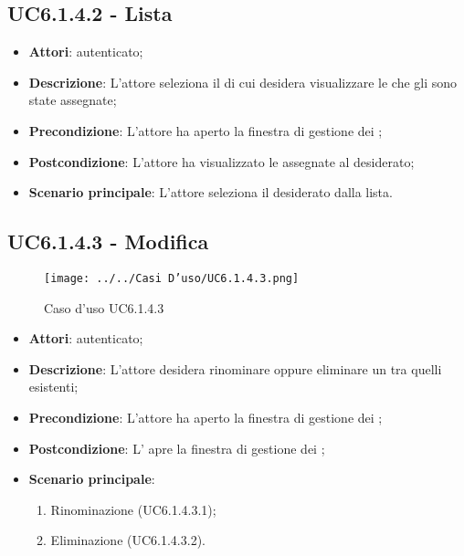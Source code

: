 \subsection{UC6.1.4.2 - Lista }
\label{ssec:UC6.1.4.2}
\begin{itemize}
\item \textbf{Attori}:  autenticato;
\item \textbf{Descrizione}: L'attore seleziona il  di cui desidera visualizzare le  che gli sono state assegnate;
\item \textbf{Precondizione}: L'attore ha aperto la finestra di gestione dei ;
\item \textbf{Postcondizione}: L'attore ha visualizzato le  assegnate al  desiderato;
\item \textbf{Scenario principale}: L'attore seleziona il  desiderato dalla lista.
\end{itemize}
\newpage
\subsection{UC6.1.4.3 - Modifica }
\label{ssec:UC6.1.4.3}
\begin{figure}[h!]
\centering
\texttt{[image: ../../Casi D'uso/UC6.1.4.3.png]}
\caption{Caso d'uso UC6.1.4.3}
 \end{figure}
\begin{itemize}
\item \textbf{Attori}:  autenticato;
\item \textbf{Descrizione}: L'attore desidera rinominare oppure eliminare un  tra quelli esistenti;
\item \textbf{Precondizione}: L'attore ha aperto la finestra di gestione dei ;
\item \textbf{Postcondizione}: L' apre la finestra di gestione dei ;
\item \textbf{Scenario principale}: \begin{enumerate}\item Rinominazione  (UC6.1.4.3.1);\item Eliminazione  (UC6.1.4.3.2).
 \end{enumerate}
\end{itemize}
